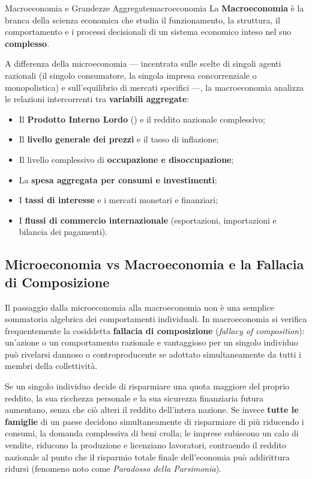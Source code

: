 \begin{definizione}{Macroeconomia e Grandezze Aggregate}{macroeconomia}
La \textbf{Macroeconomia} è la branca della scienza economica che studia il funzionamento, la struttura, il comportamento e i processi decisionali di un sistema economico inteso nel suo \textbf{complesso}. 

A differenza della microeconomia — incentrata sulle scelte di singoli agenti razionali (il singolo consumatore, la singola impresa concorrenziale o monopolistica) e sull'equilibrio di mercati specifici —, la macroeconomia analizza le relazioni intercorrenti tra \textbf{variabili aggregate}:
\begin{itemize}
    \item Il \textbf{Prodotto Interno Lordo} (\PIL) e il reddito nazionale complessivo;
    \item Il \textbf{livello generale dei prezzi} e il tasso di inflazione;
    \item Il livello complessivo di \textbf{occupazione e disoccupazione};
    \item La \textbf{spesa aggregata per consumi e investimenti};
    \item I \textbf{tassi di interesse} e i mercati monetari e finanziari;
    \item I \textbf{flussi di commercio internazionale} (esportazioni, importazioni e bilancia dei pagamenti).
\end{itemize}
\end{definizione}

\subsection{Microeconomia vs Macroeconomia e la Fallacia di Composizione}
Il passaggio dalla microeconomia alla macroeconomia non è una semplice sommatoria algebrica dei comportamenti individuali. In macroeconomia si verifica frequentemente la cosiddetta \textbf{fallacia di composizione} (\textit{fallacy of composition}): un'azione o un comportamento razionale e vantaggioso per un singolo individuo può rivelarsi dannoso o controproducente se adottato simultaneamente da tutti i membri della collettività.

\begin{esempio}
Se un singolo individuo decide di risparmiare una quota maggiore del proprio reddito, la sua ricchezza personale e la sua sicurezza finanziaria futura aumentano, senza che ciò alteri il reddito dell'intera nazione. Se invece \textbf{tutte le famiglie} di un paese decidono simultaneamente di risparmiare di più riducendo i consumi, la domanda complessiva di beni crolla; le imprese subiscono un calo di vendite, riducono la produzione e licenziano lavoratori, contraendo il reddito nazionale al punto che il risparmio totale finale dell'economia può addirittura ridursi (fenomeno noto come \textit{Paradosso della Parsimonia}).
\end{esempio}

